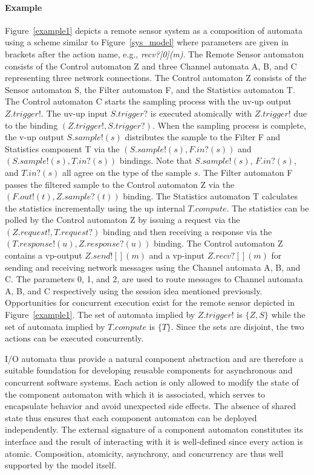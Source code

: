 \paragraph*{Example}
Figure~\ref{example1} depicts a remote sensor system as a composition of automata using a scheme similar to Figure~\ref{sys_model} where parameters are given in brackets after the action name, e.g., \emph{recv?[0](m)}.
The Remote Sensor automaton consists of the Control automaton Z and three Channel automata A, B, and C representing three network connections.
The Control automaton Z consists of the Sensor automaton S, the Filter automaton F, and the Statistics automaton T.
The Control automaton C starts the sampling process with the uv-up output $Z.trigger!$.
The uv-up input $S.trigger?$ is executed atomically with $Z.trigger!$ due to the binding $(Z.trigger!, S.trigger?)$.
When the sampling process is complete, the v-up output $S.sample!(s)$ distributes the sample to the Filter F and Statistics component T via the $(S.sample!(s), F.in?(s))$ and $(S.sample!(s), T.in?(s))$ bindings.
Note that $S.sample!(s)$, $F.in?(s)$, and $T.in?(s)$ all agree on the type of the sample $s$.
The Filter automaton F passes the filtered sample to the Control automaton Z via the $(F.out!(t), Z.sample?(t))$ binding.
The Statistics automaton T calculates the statistics incrementally using the up internal $T.compute$.
The statistics can be polled by the Control automaton Z by issuing a request via the $(Z.request!, T.request?)$ binding and then receiving a response via the $(T.response!(u), Z.response?(u))$ binding.
The Control automaton Z contains a vp-output $Z.send![](m)$ and a vp-input $Z.recv?[](m)$ for sending and receiving network messages using the Channel automata A, B, and C.
The parameters 0, 1, and 2, are used to route messages to Channel automata A, B, and C respectively using the session idea mentioned previously.
Opportunities for concurrent execution exist for the remote sensor depicted in Figure~\ref{example1}.
The set of automata implied by $Z.trigger!$ is $\{Z, S\}$ while the set of automata implied by $T.compute$ is $\{T\}$.
Since the sets are disjoint, the two actions can be executed concurrently.
\fi

I/O automata thus provide a natural component abstraction and are therefore a suitable foundation for developing reusable components for asynchronous and concurrent software systems.
Each action is only allowed to modify the state of the component automaton with which it is associated, which serves to encapsulate behavior and avoid unexpected side effects.
The absence of shared state thus ensures that each component automaton can be deployed independently.
The external signature of a component automaton constitutes its interface and the result of interacting with it is well-defined since every action is atomic.
Composition, atomicity, asynchrony, and concurrency are thus well supported by the model itself.

